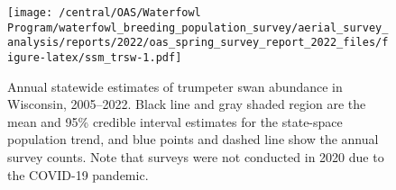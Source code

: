 \documentclass[
  12pt,
]{article}
\begin{document}
\newpage

\begin{figure}
\centering
\texttt{[image: /central/OAS/Waterfowl Program/waterfowl\_breeding\_population\_survey/aerial\_survey\_analysis/reports/2022/oas\_spring\_survey\_report\_2022\_files/figure-latex/ssm\_trsw-1.pdf]}
\caption{\label{fig:ssm_trsw}Annual statewide estimates of trumpeter
swan abundance in Wisconsin, 2005--2022. Black line and gray shaded
region are the mean and 95\% credible interval estimates for the
state-space population trend, and blue points and dashed line show the
annual survey counts. Note that surveys were not conducted in 2020 due
to the COVID-19 pandemic.}
\end{figure}
\end{document}
